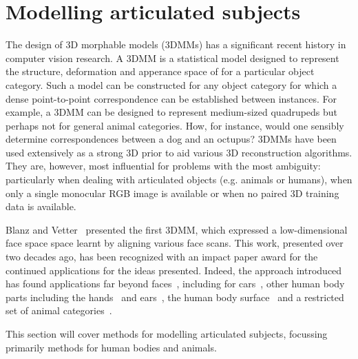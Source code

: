 \section{Modelling articulated subjects}



The design of 3D morphable models (3DMMs) has a significant recent history in computer vision research. A 3DMM is a statistical model designed to represent the structure, deformation and apperance space of for a particular object category. Such a model can be constructed for any object category for which a dense point-to-point correspondence can be established between instances. For example, a 3DMM can be designed to represent medium-sized quadrupeds but perhaps not for general animal categories. How, for instance, would one sensibly determine correspondences between a dog and an octupus? 3DMMs have been used extensively as a strong 3D prior to aid various 3D reconstruction algorithms. They are, however, most influential for problems with the most ambiguity: particularly when dealing with articulated objects (e.g. animals or humans), when only a single monocular RGB image is available or when no paired 3D training data is available. 


Blanz and Vetter~\cite{blanz-vetter} presented the first 3DMM, which expressed a low-dimensional face space space learnt by aligning various face scans. This work, presented over two decades ago, has been recognized with an impact paper award for the continued applications for the ideas presented. Indeed, the approach introduced has found applications far beyond faces~\cite{face-warehouse, basel-old, basel-new}, including for cars~\cite{deformable-cars}, other human body parts including the hands~\cite{Khamis_2015_CVPR} and ears~\cite{deformable-ears}, the human body surface~\cite{anguelov05scape,loper15smpl} and a restricted set of animal categories~\cite{cafm, zuffi2017menagerie}.


This section will cover methods for modelling articulated subjects, focussing primarily methods for human bodies and animals. 


